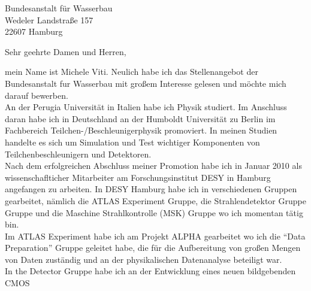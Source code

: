 \documentclass[ebner,paper=a4,fontsize=11pt,ngerman,BCOR=10mm]{scrlttr2}%
\begin{document}
\pagestyle{empty}

\begin{letter}{Bundesanstalt f\"ur Wasserbau\\
Wedeler Landstra{\ss}e 157\\ 
22607 Hamburg}


\setlength{\parindent}{15pt}

\opening{Sehr geehrte Damen und Herren,} 

mein Name ist Michele Viti. Neulich habe
ich das Stellenangebot der Bundesanstalt f{u}r Wasserbau mit gro{\ss}em
Interesse gelesen und m{\"o}chte mich darauf bewerben. \\ 
% 
% 
% 
\indent An der Perugia Universit\"at in Italien habe ich Physik studiert. Im
Anschluss daran habe ich in Deutschland an der Humboldt Universit\"at
zu Berlin im Fachbereich Teilchen-/Beschleunigerphysik promoviert. In
meinen Studien handelte es sich um Simulation und Test wichtiger
Komponenten von Teilchenbeschleunigern und Detektoren.\\
\indent Nach dem erfolgreichen Abschluss meiner Promotion habe ich in Januar
2010 als wissenschaflticher Mitarbeiter am Forschungsinstitut DESY in Hamburg
angefangen zu arbeiten. In DESY Hamburg habe ich in verschiedenen Gruppen
gearbeitet, n{\"a}mlich die ATLAS Experiment Gruppe, die Strahlendetektor Gruppe
Gruppe und die Maschine Strahlkontrolle (MSK) Gruppe wo ich momentan t{\"a}tig bin. \\
Im ATLAS Experiment habe ich am Projekt ALPHA gearbeitet wo ich die "`Data
Preparation"' Gruppe geleitet habe, die f{\"u}r die Aufbereitung von gro{\ss}en
Mengen von Daten zust{\"a}ndig und an der physikalischen Datenanalyse beteiligt
war.\\
In the Detector Gruppe habe ich an der Entwicklung eines neuen bildgebenden CMOS

\end{letter}
\end{document}
